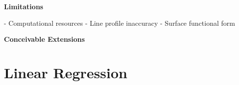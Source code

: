 \documentclass[twocolumn]{aastex631}
\begin{document}
\begin{mdframed}
    \textbf{Limitations}

    - Computational resources
    - Line profile inaccuracy
    - Surface functional form

    \textcolor{lightgray}{\blindtext}
\end{mdframed}


\begin{mdframed}
    \textbf{Conceivable Extensions}

    \textcolor{lightgray}{\blindtext}
\end{mdframed}


\pagebreak
\newpage

\begin{acknowledgments}
    \blindtext
\end{acknowledgments}


\software{}


\clearpage

\appendix
\section{Linear Regression}
\blindtext
\end{document}
